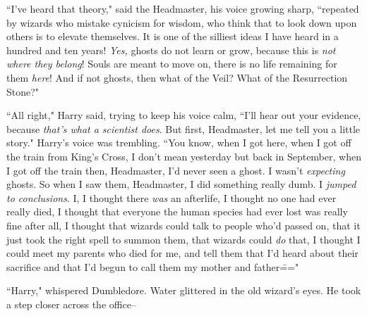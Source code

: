 ``I've heard that theory," said the Headmaster, his voice growing sharp, ``repeated by wizards who mistake cynicism for wisdom, who think that to look down upon others is to elevate themselves. It is one of the silliest ideas I have heard in a hundred and ten years! \emph{Yes,} ghosts do not learn or grow, because this is \emph{not where they belong}! Souls are meant to move on, there is no life remaining for them \emph{here}! And if not ghosts, then what of the Veil? What of the Resurrection Stone?"

``All right," Harry said, trying to keep his voice calm, ``I'll hear out your evidence, because \emph{that's what a scientist does}. But first, Headmaster, let me tell you a little story." Harry's voice was trembling. ``You know, when I got here, when I got off the train from King's Cross, I don't mean yesterday but back in September, when I got off the train then, Headmaster, I'd never seen a ghost. I wasn't \emph{expecting} ghosts. So when I saw them, Headmaster, I did something really dumb. I \emph{jumped to conclusions}. I, I thought there \emph{was} an afterlife, I thought no one had ever really died, I thought that everyone the human species had ever lost was really fine after all, I thought that wizards could talk to people who'd passed on, that it just took the right spell to summon them, that wizards could \emph{do} that, I thought I could meet my parents who died for me, and tell them that I'd heard about their sacrifice and that I'd begun to call them my mother and father\==="

``Harry," whispered Dumbledore. Water glittered in the old wizard's eyes. He took a step closer across the office\---

